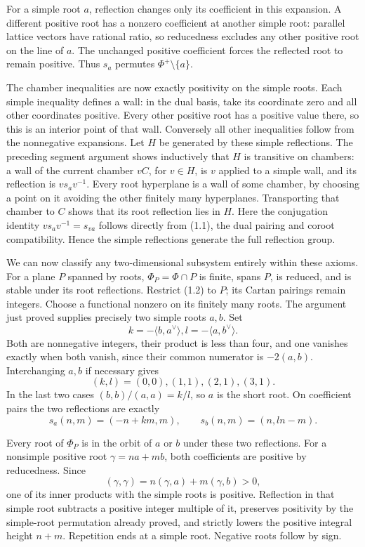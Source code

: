 \documentclass[11pt,a4paper,openany]{report}
\begin{document}
For a simple root \(a\), reflection changes only its coefficient in this expansion. A different positive root has a nonzero coefficient at another simple root: parallel lattice vectors have rational ratio, so reducedness excludes any other positive root on the line of \(a\). The unchanged positive coefficient forces the reflected root to remain positive. Thus \(s_a\) permutes \(\Phi^+\setminus\{a\}\).

The chamber inequalities are now exactly positivity on the simple roots. Each simple inequality defines a wall: in the dual basis, take its coordinate zero and all other coordinates positive. Every other positive root has a positive value there, so this is an interior point of that wall. Conversely all other inequalities follow from the nonnegative expansions. Let \(H\) be generated by these simple reflections. The preceding segment argument shows inductively that \(H\) is transitive on chambers: a wall of the current chamber \(vC\), for \(v\in H\), is \(v\) applied to a simple wall, and its reflection is \(v s_a v^{-1}\). Every root hyperplane is a wall of some chamber, by choosing a point on it avoiding the other finitely many hyperplanes. Transporting that chamber to \(C\) shows that its root reflection lies in \(H\). Here the conjugation identity \(v s_a v^{-1}=s_{va}\) follows directly from (1.1), the dual pairing and coroot compatibility. Hence the simple reflections generate the full reflection group.

We can now classify any two-dimensional subsystem entirely within these axioms. For a plane \(P\) spanned by roots, \(\Phi_P=\Phi\cap P\) is finite, spans \(P\), is reduced, and is stable under its root reflections. Restrict (1.2) to \(P\); its Cartan pairings remain integers. Choose a functional nonzero on its finitely many roots. The argument just proved supplies precisely two simple roots \(a,b\). Set \[
                 k=-\langle b,a^\vee\rangle,
                 l=-\langle a,b^\vee\rangle.
\] Both are nonnegative integers, their product is less than four, and one vanishes exactly when both vanish, since their common numerator is \(-2(a,b)\). Interchanging \(a,b\) if necessary gives \[
                    (k,l)=(0,0),(1,1),(2,1),(3,1).
\] In the last two cases \((b,b)/(a,a)=k/l\), so \(a\) is the short root. On coefficient pairs the two reflections are exactly \[
 s_a(n,m)=(-n+km,m),\qquad s_b(n,m)=(n,ln-m).
\]

Every root of \(\Phi_P\) is in the orbit of \(a\) or \(b\) under these two reflections. For a nonsimple positive root \(\gamma=na+mb\), both coefficients are positive by reducedness. Since \[
            (\gamma,\gamma)=n(\gamma,a)+m(\gamma,b)>0,
\] one of its inner products with the simple roots is positive. Reflection in that simple root subtracts a positive integer multiple of it, preserves positivity by the simple-root permutation already proved, and strictly lowers the positive integral height \(n+m\). Repetition ends at a simple root. Negative roots follow by sign.
\end{document}
